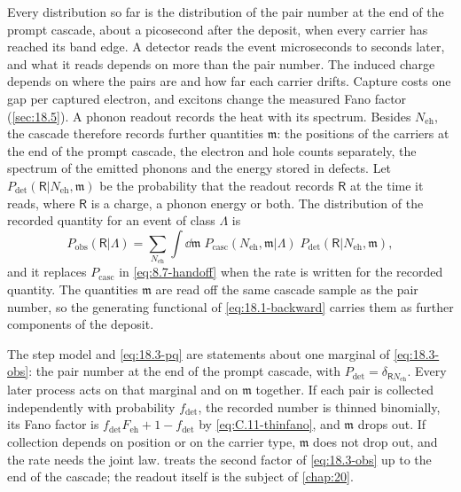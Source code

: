 Every distribution so far is the distribution of the pair number at the end of the prompt cascade, about a picosecond after the deposit, when every carrier has reached its band edge. A detector reads the event microseconds to seconds later, and what it reads depends on more than the pair number. The induced charge depends on where the pairs are and how far each carrier drifts. Capture costs one gap per captured electron, and excitons change the measured Fano factor (\cref{sec:18.5}). A phonon readout records the heat with its spectrum. Besides $N_{\mathrm{eh}}$, the cascade therefore records further quantities $\mathfrak{m}$: the positions of the carriers at the end of the prompt cascade, the electron and hole counts separately, the spectrum of the emitted phonons and the energy stored in defects. Let $P_{\mathrm{det}}(\mathsf{R}|N_{\mathrm{eh}},\mathfrak{m})$ be the probability that the readout records $\mathsf{R}$ at the time it reads, where $\mathsf{R}$ is a charge, a phonon energy or both. The distribution of the recorded quantity for an event of class $\Lambda$ is
\begin{equation}
  P_{\mathrm{obs}}(\mathsf{R}|\Lambda) = \sum_{N_{\mathrm{eh}}}\int\dd\mathfrak{m}\;P_{\mathrm{casc}}(N_{\mathrm{eh}},\mathfrak{m}|\Lambda)\;P_{\mathrm{det}}(\mathsf{R}|N_{\mathrm{eh}},\mathfrak{m}) ,
  \label{eq:18.3-obs}
\end{equation}
and it replaces $P_{\mathrm{casc}}$ in \cref{eq:8.7-handoff} when the rate is written for the recorded quantity. The quantities $\mathfrak{m}$ are read off the same cascade sample as the pair number, so the generating functional of \cref{eq:18.1-backward} carries them as further components of the deposit.

The step model and \cref{eq:18.3-pq} are statements about one marginal of \cref{eq:18.3-obs}: the pair number at the end of the prompt cascade, with $P_{\mathrm{det}} = \delta_{\mathsf{R}N_{\mathrm{eh}}}$. Every later process acts on that marginal and on $\mathfrak{m}$ together. If each pair is collected independently with probability $f_{\mathrm{det}}$, the recorded number is thinned binomially, its Fano factor is $f_{\mathrm{det}}F_{\mathrm{eh}} + 1 - f_{\mathrm{det}}$ by \cref{eq:C.11-thinfano}, and $\mathfrak{m}$ drops out. If collection depends on position or on the carrier type, $\mathfrak{m}$ does not drop out, and the rate needs the joint law.  treats the second factor of \cref{eq:18.3-obs} up to the end of the cascade; the readout itself is the subject of \cref{chap:20}.

